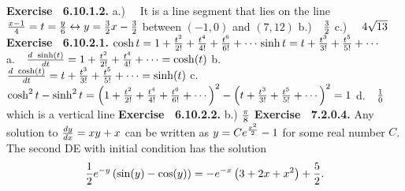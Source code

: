  {\noindent \protect \bf  Exercise ~6.10.1.2.} a.)~~ It is a line segment that lies on the line $\protect \frac  {x-1}{4} = t = \protect \frac  {y}{6} \leftrightarrow y = \protect \frac  {3}{2} x - \protect \frac  {3}{2} $ between $(-1,0)$ and $(7,12)$ \protect \newline  b.)~~$\protect \frac  {3}{2}$ \protect \newline  c.)~~ $4\protect \sqrt  {13}$ \protect \newline  \protect \newline  
 {\noindent \protect \bf  Exercise ~6.10.2.1.} $\protect \qopname  \relax o{cosh}{t} = 1+\protect \frac  {t^2}{2!} + \protect \frac  {t^4}{4!}+\protect \frac  {t^6}{6!} + \protect \cdots  $\protect \newline  $\protect \qopname  \relax o{sinh}{t} = t + \protect \frac  {t^3}{3!} + \protect \frac  {t^5}{5!}+ \protect \cdots  $ \protect \newline  a.~~$\protect \frac  {d ~\protect \qopname  \relax o{sinh}(t)}{dt} = 1+\protect \frac  {t^2}{2!}+\protect \frac  {t^4}{4!} + \protect \cdots  =\protect \qopname  \relax o{cosh}(t)$ \protect \newline  b.~~$\protect \frac  {d ~\protect \qopname  \relax o{cosh}(t)}{dt} = t+\protect \frac  {t^3}{3!}+\protect \frac  {t^5}{5!} + \protect \cdots  =\protect \qopname  \relax o{sinh}(t)$ \protect \newline  c.~~$ \protect \qopname  \relax o{cosh}^2{t}- \protect \qopname  \relax o{sinh}^2{t} = \left (1+\protect \frac  {t^2}{2!} + \protect \frac  {t^4}{4!}+\protect \frac  {t^6}{6!} + \protect \cdots  \right )^2 - \left (t + \protect \frac  {t^3}{3!} + \protect \frac  {t^5}{5!}+ \protect \cdots  \right )^2 = 1 $ \protect \newline  d.~~$\protect \frac  {1}{0}$ which is a vertical line \protect \newline  \protect \newline  
 {\noindent \protect \bf  Exercise ~6.10.2.2.}  b.) $\protect \frac  {\pi }{8}$\protect \newline   \protect \newline  \protect \newline  
 {\noindent \protect \bf  Exercise ~7.2.0.4.} Any solution to $\protect \frac  {dy}{dx}=xy+x$ can be written as $y=Ce^{\protect \frac  {x^2}{2}}-1$ for some real number $C$. The second DE with initial condition has the solution $$\protect \frac  {1}{2}e^{-y}\left (\protect \qopname  \relax o{sin}(y)-\protect \qopname  \relax o{cos}(y)\right )=-e^{-x}\left (3+2x+x^2\right )+\protect \frac  {5}{2}. $$ \protect \newline  \protect \newline  
